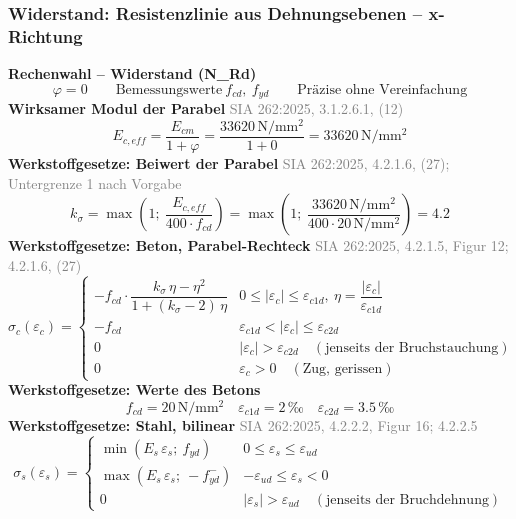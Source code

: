 \documentclass[11pt,a4paper]{article}
\newcommand{\normref}[1]{{\small\textcolor{gray}{#1}}}
\begin{document}
\subsubsection{Widerstand: Resistenzlinie aus Dehnungsebenen – x-Richtung}
\noindent\textbf{Rechenwahl – Widerstand (N\_Rd)}
\begin{equation*}
\varphi = 0 \qquad \text{Bemessungswerte}\ f_{cd},\ f_{yd} \qquad \text{Präzise ohne Vereinfachung}
\end{equation*}
\noindent\textbf{Wirksamer Modul der Parabel} \hfill \normref{SIA 262:2025, 3.1.2.6.1, (12)}
\begin{equation*}
E_{c,eff} = \frac{E_{cm}}{1 + \varphi} = \frac{33620\,\mathrm{N}/\mathrm{mm}^{2}}{1 + 0} = 33620\,\mathrm{N}/\mathrm{mm}^{2}
\end{equation*}
\noindent\textbf{Werkstoffgesetze: Beiwert der Parabel} \hfill \normref{SIA 262:2025, 4.2.1.6, (27); Untergrenze 1 nach Vorgabe}
\begin{equation*}
k_{\sigma} = \max\left(1;\ \frac{E_{c,eff}}{400 \cdot f_{cd}}\right) = \max\left(1;\ \frac{33620\,\mathrm{N}/\mathrm{mm}^{2}}{400 \cdot 20\,\mathrm{N}/\mathrm{mm}^{2}}\right) = 4.2
\end{equation*}
\noindent\textbf{Werkstoffgesetze: Beton, Parabel-Rechteck} \hfill \normref{SIA 262:2025, 4.2.1.5, Figur 12; 4.2.1.6, (27)}
\begin{equation*}
\sigma_c(\varepsilon_c) = \begin{cases} -f_{cd} \cdot \dfrac{k_\sigma\,\eta - \eta^2}{1 + (k_\sigma - 2)\,\eta} & 0 \le |\varepsilon_c| \le \varepsilon_{c1d},\ \eta = \dfrac{|\varepsilon_c|}{\varepsilon_{c1d}} \\[2ex] -f_{cd} & \varepsilon_{c1d} < |\varepsilon_c| \le \varepsilon_{c2d} \\[1ex] 0 & |\varepsilon_c| > \varepsilon_{c2d} \quad (\text{jenseits der Bruchstauchung}) \\[1ex] 0 & \varepsilon_c > 0 \quad (\text{Zug, gerissen}) \end{cases}
\end{equation*}
\noindent\textbf{Werkstoffgesetze: Werte des Betons}
\begin{equation*}
f_{cd} = 20\,\mathrm{N}/\mathrm{mm}^{2} \quad \varepsilon_{c1d} = 2\,\text{‰} \quad \varepsilon_{c2d} = 3.5\,\text{‰}
\end{equation*}
\noindent\textbf{Werkstoffgesetze: Stahl, bilinear} \hfill \normref{SIA 262:2025, 4.2.2.2, Figur 16; 4.2.2.5}
\begin{equation*}
\sigma_s(\varepsilon_s) = \begin{cases} \min(E_s\,\varepsilon_s;\ f_{yd}) & 0 \le \varepsilon_s \le \varepsilon_{ud} \\[1ex] \max(E_s\,\varepsilon_s;\ -f_{yd}^{-}) & -\varepsilon_{ud} \le \varepsilon_s < 0 \\[1ex] 0 & |\varepsilon_s| > \varepsilon_{ud} \quad (\text{jenseits der Bruchdehnung}) \end{cases}
\end{equation*}
\end{document}
